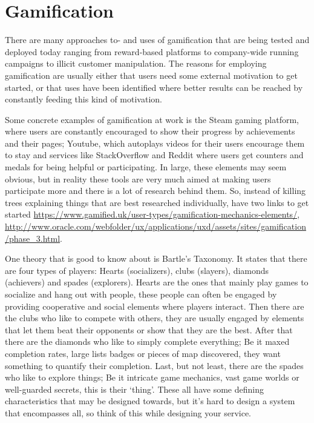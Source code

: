 \section*{Gamification}
\begin{refsection}
There are many approaches to- and uses of gamification that are being tested and deployed today ranging from reward-based platforms to company-wide running campaigns to illicit customer manipulation. The reasons for employing gamification are usually either that users need some external motivation to get started, or that uses have been identified where better results can be reached by constantly feeding this kind of motivation.

    Some concrete examples of gamification at work is the Steam gaming platform, where users are constantly encouraged to show their progress by achievements and their pages; Youtube, which autoplays videos for their users encourage them to stay and services like StackOverflow and Reddit where users get counters and medals for being helpful or participating. In large, these elements may seem obvious, but in reality these tools are very much aimed at making users participate more and there is a lot of research behind them. So, instead of killing trees explaining things that are best researched individually, have two links to get started \url{https://www.gamified.uk/user-types/gamification-mechanics-elements/}, \url{http://www.oracle.com/webfolder/ux/applications/uxd/assets/sites/gamification/phase_3.html}.

    One theory that is good to know about is Bartle's Taxonomy\supercite{bartle}. It states that there are four types of players: Hearts (socializers), clubs (slayers), diamonds (achievers) and spades (explorers). Hearts are the ones that mainly play games to socialize and hang out with people, these people can often be engaged by providing cooperative and social elements where players interact. Then there are the clubs who like to compete with others, they are usually engaged by elements that let them beat their opponents or show that they are the best. After that there are the diamonds who like to simply complete everything; Be it maxed completion rates, large lists badges or pieces of map discovered, they want something to quantify their completion. Last, but not least, there are the spades who like to explore things; Be it intricate game mechanics, vast game worlds or well-guarded secrets, this is their `thing'. These all have some defining characteristics that may be designed towards, but it's hard to design a system that encompasses all, so think of this while designing your service.

\printbibliography[heading=subbibliography]

\end{refsection}

